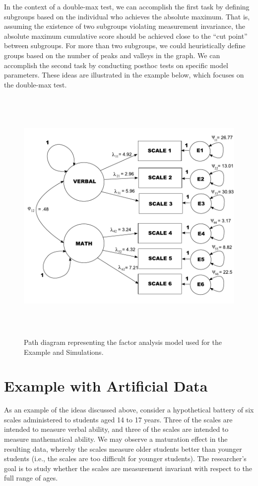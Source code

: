 \documentclass[man]{apa}
\begin{document}
In the context of a double-max test, we can accomplish the first task
by defining subgroups
based on the individual who achieves the absolute
maximum.  That is, assuming the existence of two subgroups
violating measurement invariance, the absolute maximum cumulative
score should be achieved close to 
the ``cut point'' between subgroups.  For more than two subgroups, we
could heuristically define groups based on the number of peaks and
valleys in the graph.
We can accomplish the second task by conducting posthoc
tests on specific model parameters.  These ideas are illustrated in
the example below, which focuses on the double-max test.

\begin{figure}
\caption{Path diagram representing the factor analysis model used for
  the Example and Simulations.}
\label{fig:famod}
\includegraphics[height=5in]{famod.pdf}
%
\end{figure}

\section{Example with Artificial Data}

As an example of the ideas discussed above, consider a
hypothetical battery of six scales administered to students aged 14 to 17
years.  Three of the scales are intended to measure verbal ability, and
three of the scales are intended to measure mathematical ability.  We
may observe a maturation effect in the resulting data, whereby the scales
measure older students better than younger students (i.e., the scales
are too difficult for younger students).  The researcher's goal is to
study whether the scales are measurement invariant with
respect to the full range of ages.
\end{document}
